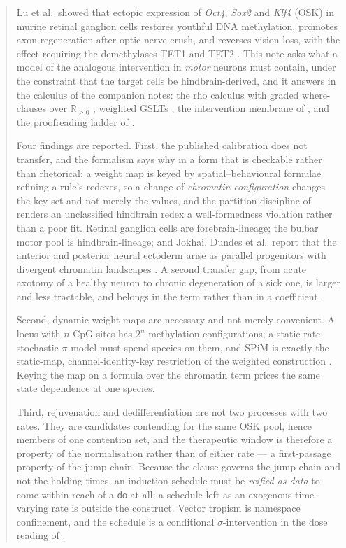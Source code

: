 \documentclass[11pt,a4paper]{article}
\theoremstyle{plain}
\theoremstyle{definition}
\theoremstyle{remark}
\newcommand{\Rnn}{\mathbb{R}_{\geq 0}}
\newcommand{\dok}{\textsf{do}}
\begin{document}
\begin{abstract}
Lu et al.\ showed that ectopic expression of \emph{Oct4}, \emph{Sox2} and
\emph{Klf4} (OSK) in murine retinal ganglion cells restores youthful DNA
methylation, promotes axon regeneration after optic nerve crush, and reverses
vision loss, with the effect requiring the demethylases TET1 and TET2
\cite{LuEtAl}. This note asks what a model of the analogous intervention in
\emph{motor} neurons must contain, under the constraint that the target cells
be hindbrain-derived, and it answers in the calculus of the companion notes:
the rho calculus with graded where-clauses over $\Rnn$
\cite{GradedV4,GradedPLN}, weighted GSLTs \cite{WeightedGSLT}, the
intervention membrane of \cite{Interventions}, and the proofreading ladder of
\cite{Proofreading}.

Four findings are reported. First, the published calibration does not
transfer, and the formalism says why in a form that is checkable rather than
rhetorical: a weight map is keyed by spatial--behavioural formulae refining a
rule's redexes, so a change of \emph{chromatin configuration} changes the key
set and not merely the values, and the partition discipline of
\cite{WeightedGSLT} renders an unclassified hindbrain redex a well-formedness
violation rather than a poor fit. Retinal ganglion cells are forebrain-lineage;
the bulbar motor pool is hindbrain-lineage; and Jokhai, Dundes et al.\ report
that the anterior and posterior neural ectoderm arise as parallel progenitors
with divergent chromatin landscapes \cite{TwoOrgans}. A second transfer gap,
from acute axotomy of a healthy neuron to chronic degeneration of a sick one,
is larger and less tractable, and belongs in the term rather than in a
coefficient.

Second, dynamic weight maps are necessary and not merely convenient. A locus
with $n$ CpG sites has $2^n$ methylation configurations; a static-rate
stochastic $\pi$ model must spend species on them, and SPiM is exactly the
static-map, channel-identity-key restriction of the weighted construction
\cite{WeightedGSLT}. Keying the map on a formula over the chromatin term
prices the same state dependence at one species.

Third, rejuvenation and dedifferentiation are not two processes with two
rates. They are candidates contending for the same OSK pool, hence members of
one contention set, and the therapeutic window is therefore a property of the
normalisation rather than of either rate --- a first-passage property of the
jump chain. Because the clause governs the jump chain and not the holding
times, an induction schedule must be \emph{reified as data} to come within
reach of a $\dok$ at all; a schedule left as an exogenous time-varying rate is
outside the construct. Vector tropism is namespace confinement, and the
schedule is a conditional $\sigma$-intervention in the dose reading of
\cite{Interventions}.


\end{abstract}
\end{document}

